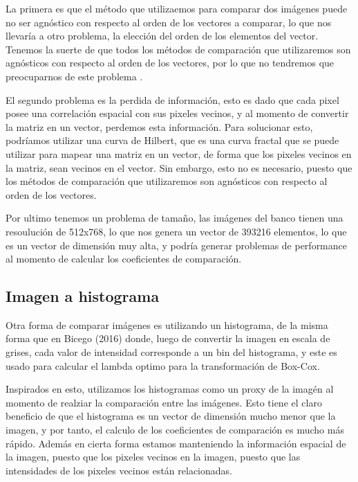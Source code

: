 La primera es que el m\'etodo que utilizaemos para comparar dos im\'agenes puede no ser agn\'ostico con respecto al orden de los vectores a comparar, lo que nos llevaría a otro problema, la elecci\'on del orden de los elementos del vector. Tenemos la suerte de que todos los m\'etodos de comparaci\'on que utilizaremos son agn\'osticos con respecto al orden de los vectores, por lo que no tendremos que preocuparnos de este problema \cite{Reshef2016} \cite{Szekely2009}.

El segundo problema es la perdida de informaci\'on, esto es dado que cada pixel posee una correlaci\'on espacial con sus pixeles vecinos, y al momento de convertir la matriz en un vector, perdemos esta informaci\'on. Para solucionar esto, podr\'iamos utilizar una curva de Hilbert, que es una curva fractal que se puede utilizar para mapear una matriz en un vector, de forma que los pixeles vecinos en la matriz, sean vecinos en el vector. Sin embargo, esto no es necesario, puesto que los m\'etodos de comparaci\'on que utilizaremos son agn\'osticos con respecto al orden de los vectores.

Por ultimo tenemos un problema de tama\~no, las im\'agenes del banco tienen una resouluci\'on de 512x768, lo que nos genera un vector de 393216 elementos, lo que es un vector de dimensi\'on muy alta, y podr\'ia generar problemas de performance al momento de calcular los coeficientes de comparaci\'on. 

\subsection{Imagen a histograma}

Otra forma de comparar im\'agenes es utilizando un histograma, de la misma forma que en Bicego (2016)\cite{bicego2016} donde, luego de convertir la imagen en escala de grises, cada valor de intensidad corresponde a un bin del histograma, y este es usado para calcular el lambda optimo para la transformaci\'on de Box-Cox. 

Inspirados en esto, utilizamos los histogramas como un proxy de la imag\'en al momento de realziar la comparaci\'on entre las im\'agenes. Esto tiene el claro beneficio de que el histograma es un vector de dimensi\'on mucho menor que la imagen, y por tanto, el calculo de los coeficientes de comparaci\'on es mucho m\'as r\'apido. Adem\'as en cierta forma estamos manteniendo la informaci\'on espacial de la imagen, puesto que los pixeles vecinos en la imagen, puesto que las intensidades de los pixeles vecinos est\'an relacionadas. 

